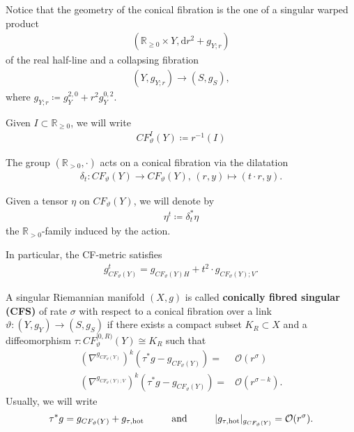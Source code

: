 \documentclass[psamsfonts]{amsart}
\theoremstyle{plain}
\theoremstyle{definition}{
\newtheorem{defi}{Definition}[section]
\newtheorem{ass}{Assumption}
\newtheorem*{nota}{Notation}}
\theoremstyle{remark}{
\newtheorem{rem}{Remark}
\newtheorem{ex}{Example}}
\theoremstyle{plain}{
\newtheorem{thm}{Theorem}[section]
\newtheorem{lem}{Lemma}[section]
\newtheorem{cor}{Corollary}[section]
\newtheorem{prop}{Proposition}[section]
\newtheorem{con}{Conjecture}[section]}
\newcommand{\m}[1]{{\mathrm{#1}}}
\newcommand{\und}[1]{\hspace{#1}\text{and}\hspace{#1}}
\begin{document}
\begin{rem}
    Notice that the geometry of the conical fibration is the one of a singular warped product 
    \begin{align*}
        (\mathbb{R}_{\geq 0}\times Y,\m{d}r^2+g_{Y;r})
    \end{align*}
    of the real half-line and a collapsing fibration 
    \begin{align*}
        \left(Y,g_{Y;r}\right)\rightarrow (S,g_S),
    \end{align*}
    where $g_{Y;r}\coloneqq g^{2,0}_{Y}+r^2g^{0,2}_{Y}$.
\end{rem}

\begin{nota}
    Given $I\subset \mathbb{R}_{\geq 0}$, we will write  
    \begin{align*}
        CF^I_\vartheta(Y)\coloneqq r^{-1}(I)
    \end{align*}
\end{nota}


The group $(\mathbb{R}_{>0},\cdot)$ acts on a conical fibration via the dilatation 
    \begin{align*}
        \delta_t\colon CF_\vartheta(Y)\rightarrow CF_\vartheta(Y),\,(r,y)\mapsto (t\cdot r,y).
    \end{align*}

\begin{nota}
    Given a tensor $\eta$ on $CF_\vartheta(Y)$, we will denote by 
    \begin{align*}
        \eta^t\coloneqq \delta^*_t\eta 
    \end{align*}
    the $\mathbb{R}_{>0}$-family induced by the action.
\end{nota} 

In particular, the CF-metric satisfies 
\begin{align*}
    g^t_{CF_\vartheta(Y)}=g_{CF_\vartheta(Y)H}+t^2\cdot g_{CF_\vartheta(Y);V}.
\end{align*}




\begin{defi}
A singular Riemannian manifold $(X,g)$ is called \textbf{conically fibred singular (CFS)} of rate $\sigma$ with respect to a conical fibration over a link $\vartheta\colon (Y,g_Y)\rightarrow (S,g_S)$ if there exists a compact subset $K_R\subset X$ and a diffeomorphism $\tau\colon CF_\vartheta^{[0,R)}(Y)\cong  K_R $ such that 
\begin{align*}
    (\nabla^{g_{CF_\vartheta(Y)}})^k\left(\tau^*g-g_{CF_\vartheta(Y)}\right)=&\mathcal{O}(r^{\sigma})\\
    (\nabla^{g_{CF_\vartheta(Y);V}})^k\left(\tau^*g-g_{CF_\vartheta(Y)}\right)=&\mathcal{O}(r^{\sigma-k}).
\end{align*}
Usually, we will write 
\begin{align*}
    \tau^*g=g_{CF_\vartheta(Y)}+g_{\tau,\m{hot}}\und{1.0cm}|g_{\tau,\m{hot}}|_{g_{CF_\vartheta(Y)}}=\mathcal{O}(r^\sigma).
\end{align*}
\end{defi}
\end{document}
